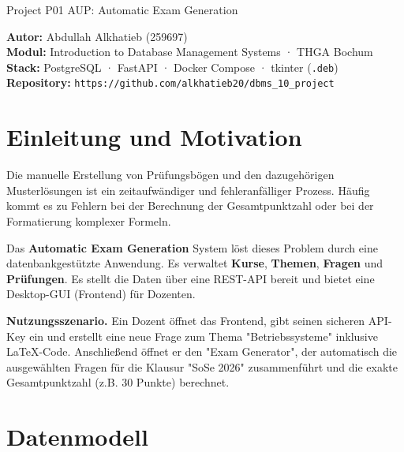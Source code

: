\documentclass[11pt,a4paper]{article}
\begin{document}
\thispagestyle{empty}
%
{Project P01 AUP: Automatic Exam Generation}

\begin{infobox}
\textbf{Autor:} Abdullah Alkhatieb (259697) \\
\textbf{Modul:} Introduction to Database Management Systems · THGA Bochum \\
\textbf{Stack:} PostgreSQL · FastAPI · Docker Compose · tkinter (\texttt{.deb}) \\
\textbf{Repository:} \texttt{https://github.com/alkhatieb20/dbms\_10\_project}
\end{infobox}

\tableofcontents
\vspace{1em}

\section{Einleitung und Motivation}

Die manuelle Erstellung von Prüfungsbögen und den dazugehörigen Musterlösungen ist ein zeitaufwändiger und fehleranfälliger Prozess. Häufig kommt es zu Fehlern bei der Berechnung der Gesamtpunktzahl oder bei der Formatierung komplexer Formeln.

Das \textbf{Automatic Exam Generation} System löst dieses Problem durch eine datenbankgestützte Anwendung. Es verwaltet \textbf{Kurse}, \textbf{Themen}, \textbf{Fragen} und \textbf{Prüfungen}. Es stellt die Daten über eine REST-API bereit und bietet eine Desktop-GUI (Frontend) für Dozenten.

\begin{beispielbox}
\textbf{Nutzungsszenario.} Ein Dozent öffnet das Frontend, gibt seinen sicheren API-Key ein und erstellt eine neue Frage zum Thema "Betriebssysteme" inklusive LaTeX-Code. Anschließend öffnet er den "Exam Generator", der automatisch die ausgewählten Fragen für die Klausur "SoSe 2026" zusammenführt und die exakte Gesamtpunktzahl (z.B. 30 Punkte) berechnet.
\end{beispielbox}

\section{Datenmodell}
\end{document}
